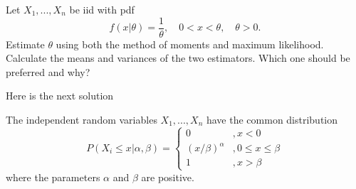 \documentclass[12pt,letterpaper]{exam}
\begin{document}
\begin{questions}

	\begin{solution}
	\end{solution}

\setcounter{question}{9-1}
\question Let $X_1,...,X_n$ be iid with pdf $$f(x|\theta) = \frac{1}{\theta}, \quad 0 < x < \theta, \quad \theta > 0.$$
Estimate $\theta$ using both the method of moments and maximum likelihood. Calculate the means and variances of the two estimators. Which one should be preferred and why?
	\begin{solution}
		Here is the next solution
	\end{solution}

\setcounter{question}{10-1}
\question The independent random variables $X_1,...,X_n$ have the common distribution
$$P(X_i \le x | \alpha, \beta) =
\begin{cases}
0 & , x< 0\\
(x/\beta)^\alpha & , 0 \le x \le \beta \\
1 & ,x > \beta
\end{cases}$$
where the parameters $\alpha$ and $\beta$ are positive.

\end{questions}
\end{document}
